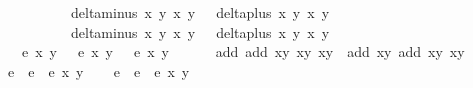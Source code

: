 \begin{isabellebody}
\ \ \ \ \ \ \ \ \ \ {\isachardoublequoteopen}delta{\isacharunderscore}minus\ x{}{\isacharprime}\ y{}{\isacharprime}\ x{}\ y{}\ {\isasymnoteq}\ {}{\isachardoublequoteclose}\ {\isachardoublequoteopen}delta{\isacharunderscore}plus\ x{}{\isacharprime}\ y{}{\isacharprime}\ x{}\ y{}\ {\isasymnoteq}\ {}{\isachardoublequoteclose}\isanewline
\ \ \ \ \ \ \ \ \ \ {\isachardoublequoteopen}delta{\isacharunderscore}minus\ x{}\ y{}\ x{}{\isacharprime}\ y{}{\isacharprime}\ {\isasymnoteq}\ {}{\isachardoublequoteclose}\ {\isachardoublequoteopen}delta{\isacharunderscore}plus\ x{}\ y{}\ x{}{\isacharprime}\ y{}{\isacharprime}\ {\isasymnoteq}\ {}{\isachardoublequoteclose}\isanewline
\ \ \ {\isachardoublequoteopen}e\ x{}\ y{}\ {\isacharequal}\ {}{\isachardoublequoteclose}\ {\isachardoublequoteopen}e\ x{}\ y{}\ {\isacharequal}\ {}{\isachardoublequoteclose}\ {\isachardoublequoteopen}e\ x{}\ y{}\ {\isacharequal}\ {}{\isachardoublequoteclose}\ \isanewline
\ \ \ {\isachardoublequoteopen}add\ {\isacharparenleft}add\ {\isacharparenleft}x{}{\isacharcomma}y{}{\isacharparenright}\ {\isacharparenleft}x{}{\isacharcomma}y{}{\isacharparenright}{\isacharparenright}\ {\isacharparenleft}x{}{\isacharcomma}y{}{\isacharparenright}\ {\isacharequal}\ add\ {\isacharparenleft}x{}{\isacharcomma}y{}{\isacharparenright}\ {\isacharparenleft}add\ {\isacharparenleft}x{}{\isacharcomma}y{}{\isacharparenright}\ {\isacharparenleft}x{}{\isacharcomma}y{}{\isacharparenright}{\isacharparenright}{\isachardoublequoteclose}\ \isanewline
%
\isadelimproof
%
\endisadelimproof
%
\isatagproof
{}\isamarkupfalse%
\ {\isacharminus}\isanewline
\ \ \isamarkupfalse%
\ e{}\ \ {\isachardoublequoteopen}e{}\ {\isacharequal}\ e\ x{}\ y{}{\isachardoublequoteclose}\isanewline
\ \ \isamarkupfalse%
\ e{}\ \ {\isachardoublequoteopen}e{}\ {\isacharequal}\ e\ x{}\ y{}{\isachardoublequoteclose}\isanewline
\ \ \isamarkupfalse%

\end{isabellebody}
